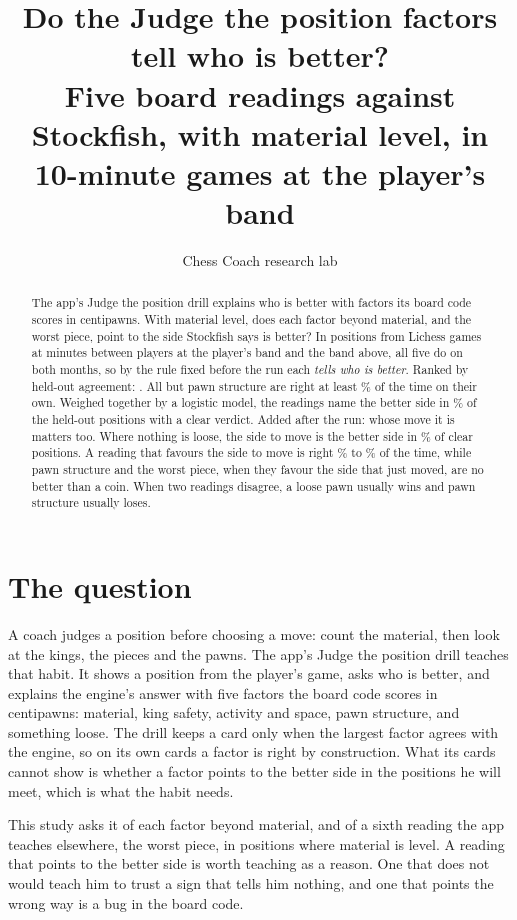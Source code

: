 \documentclass[11pt]{article}
\title{Do the Judge the position factors tell who is better?\\[0.3em]
\large Five board readings against Stockfish, with material level, in 10-minute games at the
player's band}
\author{Chess Coach research lab}
\date{}
\begin{document}
\maketitle

\begin{abstract}
The app's Judge the position drill explains who is better with factors its board code scores in
centipawns. With material level, does each factor beyond material, and the worst piece, point to
the side Stockfish says is better? In \Unique{} positions from Lichess games at \Minutes{}
minutes between players at the player's band and the band above, all five do on both months, so
by the rule fixed before the run each \emph{tells who is better}. Ranked by held-out agreement:
\Ranked. All but pawn structure are right at least \ReliablePct\% of the time on their own.
Weighed together by a logistic model, the readings name the better side in \LogHeld\% of the
held-out positions with a clear verdict. Added after the run: whose move it is matters too.
Where nothing is loose, the side to move is the better side in \MoverHeldPct\%
of clear positions. A reading that favours the side to move is right \ForMoverMin\% to
\ForMoverMax\% of the time, while pawn structure and the worst piece, when they favour the side
that just moved, are no better than a coin. When two readings disagree, a loose pawn usually
wins and pawn structure usually loses.
\end{abstract}

\section{The question}

A coach judges a position before choosing a move: count the material, then look at the kings,
the pieces and the pawns. The app's Judge the position drill teaches that habit. It shows a
position from the player's game, asks who is better, and explains the engine's answer with five
factors the board code scores in centipawns: material, king safety, activity and space, pawn
structure, and something loose. The drill keeps a card only when the largest factor agrees with
the engine, so on its own cards a factor is right by construction. What its cards cannot show is
whether a factor points to the better side in the positions he will meet, which is what the habit
needs.

This study asks it of each factor beyond material, and of a sixth reading the app teaches
elsewhere, the worst piece, in positions where material is level. A reading that points to the
better side is worth teaching as a reason. One that does not would teach him to trust a sign that
tells him nothing, and one that points the wrong way is a bug in the board code.
\end{document}
